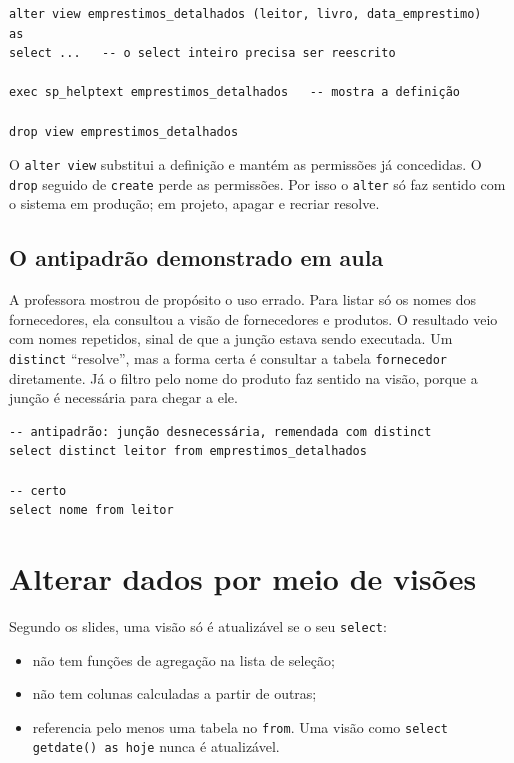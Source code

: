 \begin{lstlisting}
alter view emprestimos_detalhados (leitor, livro, data_emprestimo)
as
select ...   -- o select inteiro precisa ser reescrito

exec sp_helptext emprestimos_detalhados   -- mostra a definição

drop view emprestimos_detalhados
\end{lstlisting}

O \texttt{alter view} substitui a definição e mantém as permissões já
concedidas. O \texttt{drop} seguido de \texttt{create} perde as
permissões. Por isso o \texttt{alter} só faz sentido com o sistema em
produção; em projeto, apagar e recriar resolve.

\subsection{O antipadrão demonstrado em aula}

A professora mostrou de propósito o uso errado. Para listar só os nomes
dos fornecedores, ela consultou a visão de fornecedores e produtos. O
resultado veio com nomes repetidos, sinal de que a junção estava sendo
executada. Um \texttt{distinct} ``resolve'', mas a forma certa é
consultar a tabela \texttt{fornecedor} diretamente. Já o filtro pelo
nome do produto faz sentido na visão, porque a junção é necessária para
chegar a ele.

\begin{lstlisting}
-- antipadrão: junção desnecessária, remendada com distinct
select distinct leitor from emprestimos_detalhados

-- certo
select nome from leitor
\end{lstlisting}

\section{Alterar dados por meio de visões}

Segundo os slides, uma visão só é atualizável se o seu \texttt{select}:

\begin{itemize}
	\item não tem funções de agregação na lista de seleção;
	\item não tem colunas calculadas a partir de outras;
	\item referencia pelo menos uma tabela no \texttt{from}. Uma visão como
	\texttt{select getdate() as hoje} nunca é atualizável.
\end{itemize}

